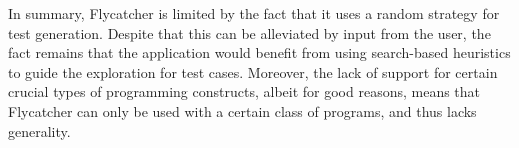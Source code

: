 In summary, \textsf{Flycatcher} is limited by the fact that it uses a random strategy for test generation. Despite that this can be alleviated by input from the user, the fact remains that the application would benefit from using search-based heuristics to guide the exploration for test cases. Moreover, the lack of support for certain crucial types of programming constructs, albeit for good reasons, means that \textsf{Flycatcher} can only be used with a certain class of programs, and thus lacks generality.

